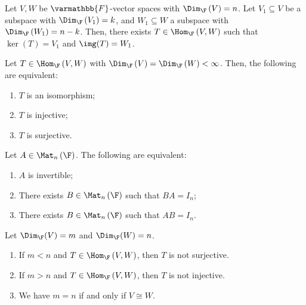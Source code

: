 \documentclass[10pt]{mypackage}
\renewcommand*{\mathbb}[1]{\varmathbb{#1}}
\begin{document}
\begin{corollary}
  Let $V,W$ be $\mathbb{F}$-vector spaces with $\Dim_{\F}\left(V\right) = n$. Let $V_1\subseteq V$ be a subspace with $\Dim_{\F}\left(V_1\right) = k$, and $W_1\subseteq W$ a subspace with $\Dim_{\F}\left(W_1\right) = n-k$. Then, there exists $T\in \Hom_{\F}\left(V,W\right)$ such that $\ker(T) = V_1$ and $\img(T) = W_1$.
\end{corollary}
\begin{corollary}
  Let $T\in \Hom_{\F}\left(V,W\right)$ with $\Dim_{\F}\left(V\right) = \Dim_{\F}\left(W\right) < \infty$. Then, the following are equivalent:
  \begin{enumerate}[(1)]
    \item $T$ is an isomorphism;
    \item $T$ is injective;
    \item $T$ is surjective.
  \end{enumerate}
\end{corollary}
\begin{corollary}
  Let $A\in \Mat_{n}\left(\F\right)$. The following are equivalent:
  \begin{enumerate}[(1)]
    \item $A$ is invertible;
    \item There exists $B\in \Mat_{n}\left(\F\right)$ such that $BA = I_{n}$;
    \item There exists $B\in \Mat_{n}\left(\F\right)$ such that $AB = I_n$.
  \end{enumerate}
\end{corollary}
\begin{corollary}
  Let $\Dim_{\F}(V) = m$ and $\Dim_{\F}(W) = n$.
  \begin{enumerate}[(1)]
    \item If $m < n$ and $T\in \Hom_{\F}\left(V,W\right)$, then $T$ is not surjective.
    \item If $m > n$ and $T\in \Hom_\F\left(V,W\right)$, then $T$ is not injective.
    \item We have $m = n$ if and only if $V\cong W$.
  \end{enumerate}
\end{corollary}
\end{document}
